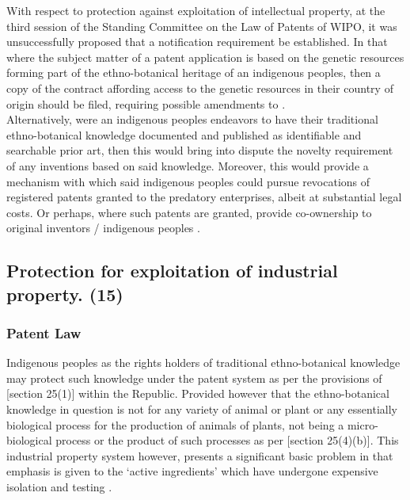 \documentclass[11pt]{article}
\begin{document}
With respect to protection against exploitation of intellectual property, at the
third session of the Standing Committee on the Law of Patents of WIPO, it was
unsuccessfully proposed that a notification requirement be established. In that
where the subject matter of a patent application is based on the genetic
resources forming part of the ethno-botanical heritage of an indigenous peoples,
then a copy of the contract affording access to the genetic resources in their
country of origin should be filed, requiring possible amendments to \cite{wipo17_pct_ai,wipo70_pct}.\\

Alternatively, were an indigenous peoples endeavors to have their traditional
ethno-botanical knowledge documented and published as identifiable and
searchable prior art, then this would bring into dispute the novelty requirement
of any inventions based on said knowledge. Moreover, this would provide a
mechanism with which said indigenous peoples could pursue revocations of
registered patents granted to the predatory enterprises, albeit at substantial
legal costs. Or perhaps, where such patents are granted, provide co-ownership to
original inventors / indigenous peoples
\cite{amechi15_leverag_trad_knowl_medicinal}.\\


\subsection{Protection for exploitation of industrial property. (15)}
\label{sec:orgbd78049}

\subsubsection{Patent Law}
\label{sec:org7f86df6}

Indigenous peoples as the rights holders of traditional ethno-botanical
knowledge may protect such knowledge under the patent system as per the
provisions of [section 25(1)]\cite{rsa78_patents_act} within the Republic.
Provided however that the ethno-botanical knowledge in question is not for any
variety of animal or plant or any essentially biological process for the
production of animals of plants, not being a micro-biological process or the
product of such processes as per [section 25(4)(b)]\cite{rsa78_patents_act}. This
industrial property system however, presents a significant basic problem in that
emphasis is given to the `active ingredients' which have undergone expensive
isolation and testing \cite{simelane09_african_trad_knowl_sys_biodiv_manag}.
\end{document}
